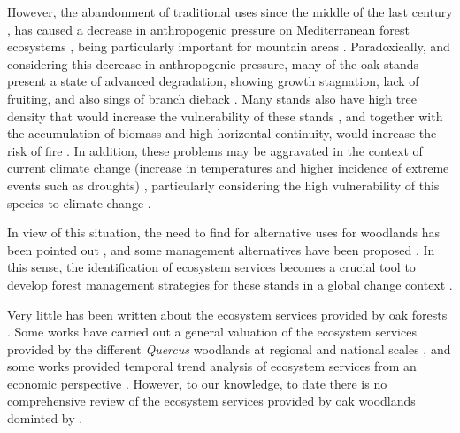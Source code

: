However, the abandonment of traditional uses since the middle of the last century \autocites{MacDonaldetal2000AgriculturalAbandonment}, has caused a decrease in anthropogenic pressure on Mediterranean forest ecosystems \autocites{ValbuenaCarabanaetal2010HistoricalRecent}, being particularly important for mountain areas \autocites{JimenezOlivenciaetal2015MedioSiglo,JimenezOlivenciaetal2015EvolucionUsos,Piasetal2014ColonizationAbandoned}. Paradoxically, and considering this decrease in anthropogenic pressure, many of the \Qp oak stands present a state of advanced degradation, showing growth stagnation, lack of fruiting, and also sings of branch dieback  \autocites{Canellasetal2004GrowthResponse, Bravoetal2008SelviculturaMontes, ValbuenaCarabanaGil2014EfectosGestion, PiqueVericat2015EvolutionPerspectives, Piqueetal2018Spain}. Many stands also have high tree density that would increase the vulnerability of these stands \autocite{McDowelletal2020PervasiveShifts}, and together with the accumulation of biomass and high horizontal continuity, would increase the risk of fire \autocites{Bravoetal2008SelviculturaMontes,GarciaJimenez20099230Robledales}. In addition, these problems may be aggravated in the context of current climate change (increase in temperatures and higher incidence of extreme events such as droughts) \autocites{IPCC2013ClimateChange,Spinonietal2018WillDrought}, particularly considering the high vulnerability of this species to climate change \autocites{Benitoetal2011SimulatingPotential,GarciaValdesetal2013ChasingMoving,SanchezdeDiosetal2009PresentFuture,GeaIzquierdoetal2013GrowthProjections}. 

In view of this situation, the need to find for alternative uses for \Qp woodlands has been pointed out \autocites{MesonMontoya1985VegetacionForestal,SanMigueletal2012BosquesMatorrales}, and some management alternatives have been proposed \autocite[\emph{e.g.} sylvopastoral uses,][]{HerreraCalvo2016UsoPastoral}. In this sense, the identification of ecosystem services becomes a crucial tool to develop forest management strategies for these stands in a global change context \autocites{Piqueetal2018Spain}. 

Very little has been written about the ecosystem services provided by oak forests \autocites{Maranonetal2012OakTrees,Maranonetal2012EstadoTendencia,MorenoLlorcaetal2012MontanaMediterranea}. Some works have carried out a general valuation of the ecosystem services provided by the different \emph{Quercus} woodlands at regional and national scales \autocite{SanMigueletal2012BosquesMatorrales,Maranonetal2012EstadoTendencia,Sousaetal2020EcosystemServices}, and some works provided temporal trend analysis of ecosystem services from an economic perspective \autocites{Caparrosetal2013EconomicsEcosystem}. However, to our knowledge, to date there is no comprehensive review of the ecosystem services provided by oak woodlands dominted by \Qp. 

